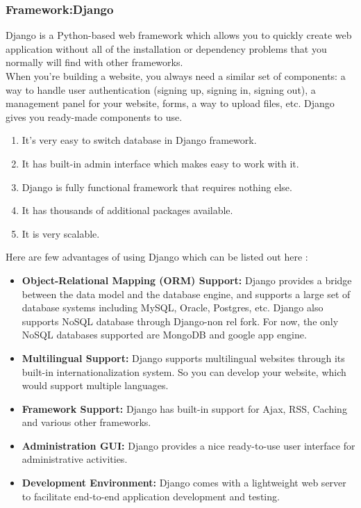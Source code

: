\documentclass[a4paper, 12pt]{report}
\begin{document}
\subsubsection{Framework:Django}
Django is a Python-based web framework which allows you to quickly create web application without all of the installation or dependency problems that you normally will find with other frameworks.
\\
When you’re building a website, you always need a similar set of components: a way to handle user authentication (signing up, signing in, signing out), a management panel for your website, forms, a way to upload files, etc. Django gives you ready-made components to use.
\begin{enumerate}
\item
It’s very easy to switch database in Django framework.
\item
It has built-in admin interface which makes easy to work with it.
\item
Django is fully functional framework that requires nothing else.
\item
It has thousands of additional packages available.
\item
It is very scalable.
\end{enumerate}
 Here are few advantages of using Django which can be listed out here :
	\begin{itemize}
	\item \textbf{Object-Relational Mapping (ORM) Support:} Django provides a bridge between the data model and the database engine, and supports a large set of database systems including MySQL, Oracle, Postgres, etc. Django also supports NoSQL database through Django-non rel fork. For now, the only NoSQL databases supported are MongoDB and google app engine. 
	\item \textbf{Multilingual Support:}	 Django supports multilingual websites through its built-in internationalization system. So you can develop your website, which would support multiple languages.
	\item \textbf{Framework Support:} Django has built-in support for Ajax, RSS, Caching and various other frameworks.
	\item \textbf{Administration GUI:} Django provides a nice ready-to-use user interface for administrative activities.
	\item \textbf{Development Environment:} Django comes with a lightweight web server to facilitate end-to-end application development and testing.

\end{itemize}
\end{document}
